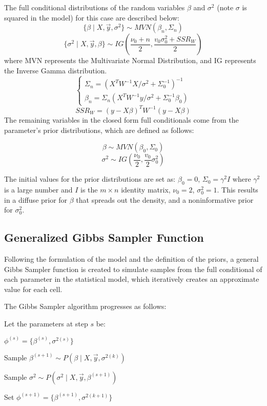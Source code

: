 \documentclass[12pt,twoside]{dukestatscithesis}
\theoremstyle{definition}
\theoremstyle{definition}
\theoremstyle{definition}
\theoremstyle{remark}
\begin{document}
The full conditional distributions of the random variables \(\beta\) and
\(\sigma^2\) (note \(\sigma\) is squared in the model) for this case are
described below:
\[\{\beta \mid X, \vec{y}, \sigma^2\} \sim MVN (\beta_n, \Sigma_n)\]
\[\{\sigma^2 \mid X, \vec{y}, \beta\} \sim IG (\frac{\nu_0 + n}{2}, \frac{v_0\sigma^2_0 + SSR_W}{2})\]
where MVN represents the Multivariate Normal Distribution, and IG
represents the Inverse Gamma distribution. \[ \begin{cases}
      \Sigma_n = (X^TW^{-1}X/\sigma^2+\Sigma_0^{-1})^{-1}\\
      \beta_n = \Sigma_n(X^TW^{-1}y/\sigma^2 + \Sigma_0^{-1} \beta_0)
    \end{cases}\] \[SSR_W = (y - X\beta)^TW^{-1}(y-X\beta)\]
The remaining variables in the closed form full conditionals come from
the parameter's prior distributions, which are defined as follows:

\[\beta \sim MVN (\beta_0, \Sigma_0)\]
\[\sigma^2 \sim IG (\frac{\nu_0}{2}, \frac{v_0}{2}\sigma_0^2)\]

The initial values for the prior distributions are set as:
\(\beta_0 = 0\), \(\Sigma_0 = \gamma^2I\) where \(\gamma^2\) is a large
number and \(I\) is the \(m \times n\) identity matrix, \(\nu_0 = 2\),
\(\sigma_0^2 = 1\). This results in a diffuse prior for \(\beta\) that
spreads out the density, and a noninformative prior for \(\sigma^2_0\).

\subsection{Generalized Gibbs Sampler
Function}\label{generalized-gibbs-sampler-function}

Following the formulation of the model and the definition of the priors,
a general Gibbs Sampler function is created to simulate samples from the
full conditional of each parameter in the statistical model, which
iteratively creates an approximate value for each cell.

The Gibbs Sampler algorithm progresses as follows:

Let the parameters at step \(s\) be:

\(\phi^{(s)} = \{\beta^{(s)}, \sigma^{2(s)}\}\)

Sample \(\beta^{(s+1)} \sim P(\beta \mid X, \vec{y}, \sigma^{2(k)})\)

Sample \(\sigma^2 \sim P(\sigma^2 \mid X, \vec{y}, \beta^{(s+1)})\)

Set \(\phi^{(s+1)} = \{\beta^{(s+1)}, \sigma^{2(k+1)}\}\)
\end{document}
